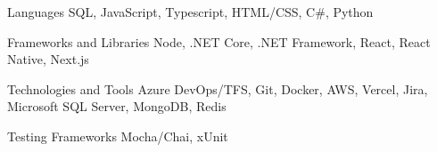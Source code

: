 

\begin{cvskills}

  \cvskill
    {Languages} %
    {SQL, JavaScript, Typescript, HTML/CSS, C\#, Python} %

  \cvskill
    {Frameworks and Libraries} %
    {Node, .NET Core, .NET Framework, React, React Native, Next.js} %

  \cvskill
    {Technologies and Tools} %
    {Azure DevOps/TFS, Git, Docker, AWS, Vercel, Jira, Microsoft SQL Server, MongoDB, Redis} %

  \cvskill
    {Testing Frameworks} %
    {Mocha/Chai, xUnit} %

\end{cvskills}
